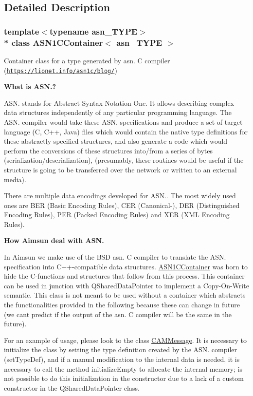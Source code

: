 \subsection{Detailed Description}
\subsubsection*{template$<$typename asn\+\_\+\+T\+Y\+PE$>$\\*
class A\+S\+N1\+C\+Container$<$ asn\+\_\+\+T\+Y\+P\+E $>$}

Container class for a type generated by asn. C compiler (\href{https://lionet.info/asn1c/blog/}{\tt https\+://lionet.\+info/asn1c/blog/}) 

{\bfseries  What is A\+S\+N.? }

A\+S\+N. stands for Abstract Syntax Notation One. It allows describing complex data structures independently of any particular programming language. The A\+S\+N. compiler would take these A\+S\+N. specifications and produce a set of target language (C, C++, Java) files which would contain the native type definitions for these abstractly specified structures, and also generate a code which would perform the conversions of these structures into/from a series of bytes (serialization/deserialization), (presumably, these routines would be useful if the structure is going to be transferred over the network or written to an external media).

There are multiple data encodings developed for A\+S\+N.. The most widely used ones are B\+ER (Basic Encoding Rules), C\+ER (Canonical-\/), D\+ER (Distinguished Encoding Rules), P\+ER (Packed Encoding Rules) and X\+ER (X\+ML Encoding Rules).

{\bfseries  How Aimsun deal with A\+S\+N. }

In Aimsun we make use of the B\+SD asn. C compiler to translate the A\+S\+N. specification into C++-\/compatible data structures. \hyperlink{classASN1CContainer}{A\+S\+N1\+C\+Container} was born to hide the C-\/functions and structures that follow from this process. This container can be used in junction with Q\+Shared\+Data\+Pointer to implement a Copy-\/\+On-\/\+Write semantic. This class is not meant to be used without a container which abstracts the functionalities provided in the following because these can change in future (we can\textquotesingle{}t predict if the output of the asn. C compiler will be the same in the future).

For an example of usage, please look to the class \hyperlink{classCAMMessage}{C\+A\+M\+Message}. It is necessary to initialize the class by setting the type definition created by the A\+S\+N. compiler (set\+Type\+Def), and if a manual modification to the internal data is needed, it is necessary to call the method initialize\+Empty to allocate the internal memory; is not possible to do this initialization in the constructor due to a lack of a custom constructor in the Q\+Shared\+Data\+Pointer class.

